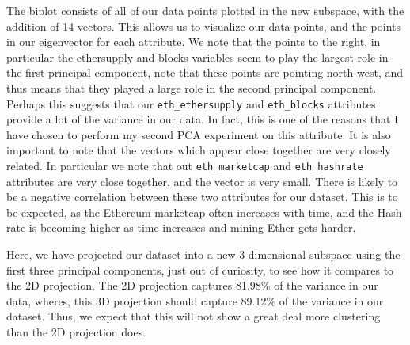 \documentclass{article}
\begin{document}
The biplot consists of all of our data points plotted in the new subspace, with the addition of 14 vectors. This allows us to visualize our data points, and the points in our eigenvector for each attribute. We note that the points to the right, in particular the ethersupply and blocks variables seem to play the largest role in the first principal component, note that these points are pointing north-west, and thus means that they played a large role in the second principal component. Perhaps this suggests that our \texttt{eth\_ethersupply} and \texttt{eth\_blocks} attributes provide a lot of the variance in our data. In fact, this is one of the reasons that I have chosen to perform my second PCA experiment on this attribute. It is also important to note that the vectors which appear close together are very closely related. In particular we note that out \texttt{eth\_marketcap} and \texttt{eth\_hashrate} attributes are very close together, and the vector is very small. There is likely to be a negative correlation between these two attributes for our dataset. This is to be expected, as the Ethereum marketcap often increases with time, and the Hash rate is becoming higher as time increases and mining Ether gets harder.
\vspace{3mm}

Here, we have projected our dataset into a new 3 dimensional subspace using the first three principal components, just out of curiosity, to see how it compares to the 2D projection. The 2D projection captures 81.98\% of the variance in our data, wheres, this 3D projection should capture 89.12\% of the variance in our dataset. Thus, we expect that this will not show a great deal more clustering than the 2D projection does. 
\end{document}
